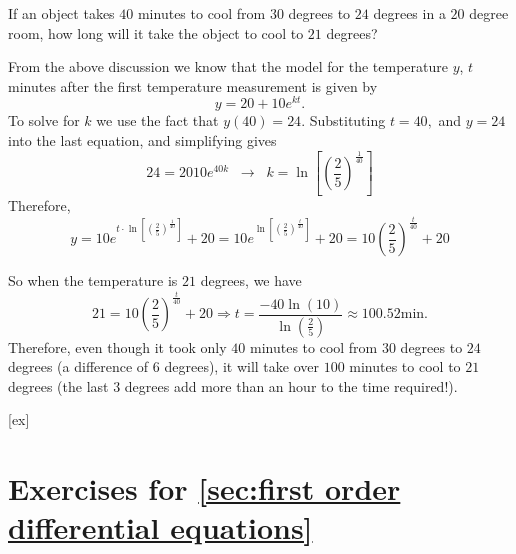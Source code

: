  
\begin{example}{}{}
If an object takes $ 40 $ minutes to cool from $ 30 $ degrees to $ 24 $ degrees in a $ 20 $
degree room, how long will it take the object to cool to $ 21 $ degrees?                                   
\end{example}


\begin{solution}
From the above discussion we know that the model for the temperature $ y $, $ t $ minutes after the first temperature measurement is given by
\[
y=20+10e^{kt}.
\]
To solve for $ k $ we use the fact that $ y(40) =24$. Substituting $ t=40, $ and $ y=24 $ into the last equation, and simplifying gives
\[
24=20 10e^{40k}\;\;\to\;\; k= \ln\left[\left(\frac{2}{5}\right)^{\frac{1}{40}}\right]
\]
Therefore, 
\[
y=10e^{t\cdot \ln\left[\left(\frac{2}{5}\right)^{\frac{1}{40}}\right]}+20 =10e^{\ln\left[\left(\frac{2}{5}\right)^{\frac{t}{40}}\right]}+20=10\left(\frac{2}{5}\right)^{\frac{t}{40}}+20
\]

So when the temperature is $ 21 $ degrees, we have
\[
21=10\left(\frac{2}{5}\right)^{\frac{t}{40}}+20\Rightarrow 
t= \frac{-40\ln(10)}{\ln\left( \frac{2}{5} \right)} \approx 100.52 \text{min.}
\]
Therefore, even though it took only $ 40 $ minutes to cool from $ 30 $ degrees to $ 24 $ degrees 
(a difference of $ 6 $ degrees),  it will take over $ 100 $ minutes to cool to $ 21 $ degrees
 (the last $ 3 $ degrees add more than an hour to the time required!).

\end{solution}




                                   




[ex]
\section*{Exercises for \ref{sec:first order differential equations}}

